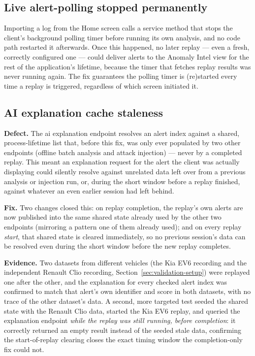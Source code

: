 \subsection{Live alert-polling stopped permanently}

Importing a log from the Home screen calls a service method that stops the client's background polling timer before running its own analysis, and no code path restarted it afterwards. Once this happened, no later replay — even a fresh, correctly configured one — could deliver alerts to the Anomaly Intel view for the rest of the application's lifetime, because the timer that fetches replay results was never running again. The fix guarantees the polling timer is (re)started every time a replay is triggered, regardless of which screen initiated it.

\subsection{AI explanation cache staleness}
\label{sec:validation-ai}

\textbf{Defect.} The \gls{ai} explanation endpoint resolves an alert index against a shared, process-lifetime list that, before this fix, was only ever populated by two other endpoints (offline batch analysis and attack injection) — never by a completed replay. This meant an explanation request for the alert the client was actually displaying could silently resolve against unrelated data left over from a previous analysis or injection run, or, during the short window before a replay finished, against whatever an even earlier session had left behind.

\textbf{Fix.} Two changes closed this: on replay completion, the replay's own alerts are now published into the same shared state already used by the other two endpoints (mirroring a pattern one of them already used); and on every replay \emph{start}, that shared state is cleared immediately, so no previous session's data can be resolved even during the short window before the new replay completes.

\textbf{Evidence.} Two datasets from different vehicles (the Kia EV6 recording and the independent Renault Clio recording, Section~\ref{sec:validation-setup}) were replayed one after the other, and the explanation for every checked alert index was confirmed to match that alert's own identifier and score in both datasets, with no trace of the other dataset's data. A second, more targeted test seeded the shared state with the Renault Clio data, started the Kia EV6 replay, and queried the explanation endpoint \emph{while the replay was still running, before completion}: it correctly returned an empty result instead of the seeded stale data, confirming the start-of-replay clearing closes the exact timing window the completion-only fix could not.

